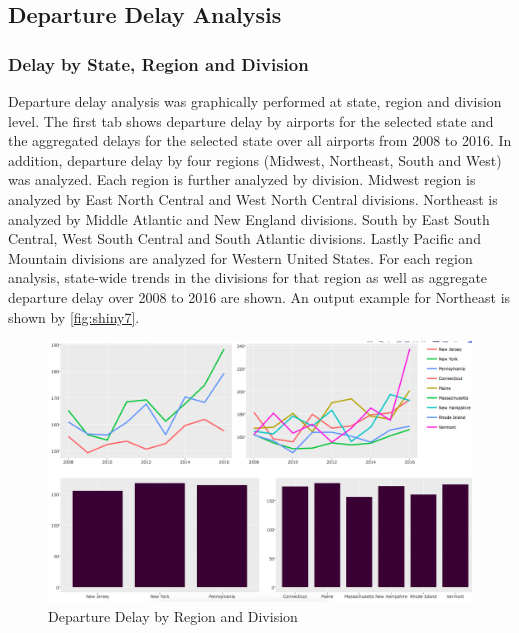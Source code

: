 \documentclass[12pt,twoside]{amherstthesis}
\begin{document}
  \subsection{Departure Delay Analysis}\label{departure-delay-analysis}
  
  \subsubsection{Delay by State, Region and
  Division}\label{delay-by-state-region-and-division}
  
  Departure delay analysis was graphically performed at state, region and
  division level. The first tab shows departure delay by airports for the
  selected state and the aggregated delays for the selected state over all
  airports from 2008 to 2016. In addition, departure delay by four regions
  (Midwest, Northeast, South and West) was analyzed. Each region is
  further analyzed by division. Midwest region is analyzed by East North
  Central and West North Central divisions. Northeast is analyzed by
  Middle Atlantic and New England divisions. South by East South Central,
  West South Central and South Atlantic divisions. Lastly Pacific and
  Mountain divisions are analyzed for Western United States. For each
  region analysis, state-wide trends in the divisions for that region as
  well as aggregate departure delay over 2008 to 2016 are shown. An output
  example for Northeast is shown by \autoref{fig:shiny7}.
  
  \begin{figure}[htbp]
  \centering
  \includegraphics[scale = 0.4,angle = 0]{figure/Northeast1.png}
  \caption[Departure Delay by Region and Division]{\normalsize{Departure Delay by Region and Division}}
  \label{fig:shiny7}
  \end{figure}
  
\end{document}

